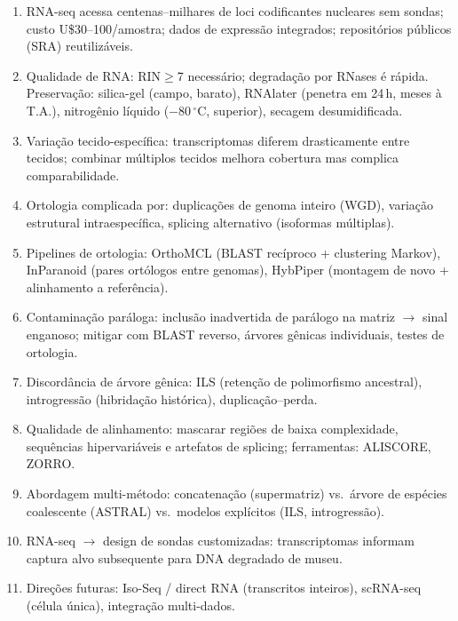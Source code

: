 \clearpage
\begin{revise}\small
\begin{enumerate}[itemsep=0pt, topsep=0pt, parsep=0pt]
    \item RNA-seq acessa centenas--milhares de loci codificantes nucleares sem sondas; custo U\$30--100/amostra; dados de expressão integrados; repositórios públicos (SRA) reutilizáveis.
    \item Qualidade de RNA: RIN$\geq$7 necessário; degradação por RNases é rápida. Preservação: silica-gel (campo, barato), RNAlater (penetra em 24\,h, meses à T.A.), nitrogênio líquido ($-80\,^\circ$C, superior), secagem desumidificada.
    \item Variação tecido-específica: transcriptomas diferem drasticamente entre tecidos; combinar múltiplos tecidos melhora cobertura mas complica comparabilidade.
    \item Ortologia complicada por: duplicações de genoma inteiro (WGD), variação estrutural intraespecífica, splicing alternativo (isoformas múltiplas).
    \item Pipelines de ortologia: OrthoMCL (BLAST recíproco + clustering Markov), InParanoid (pares ortólogos entre genomas), HybPiper (montagem de novo + alinhamento a referência).
    \item Contaminação paráloga: inclusão inadvertida de parálogo na matriz $\to$ sinal enganoso; mitigar com BLAST reverso, árvores gênicas individuais, testes de ortologia.
    \item Discordância de árvore gênica: ILS (retenção de polimorfismo ancestral), introgressão (hibridação histórica), duplicação--perda.
    \item Qualidade de alinhamento: mascarar regiões de baixa complexidade, sequências hipervariáveis e artefatos de splicing; ferramentas: ALISCORE, ZORRO.
    \item Abordagem multi-método: concatenação (supermatriz) vs.\ árvore de espécies coalescente (ASTRAL) vs.\ modelos explícitos (ILS, introgressão).
    \item RNA-seq $\to$ design de sondas customizadas: transcriptomas informam captura alvo subsequente para DNA degradado de museu.
    \item Direções futuras: Iso-Seq / direct RNA (transcritos inteiros), scRNA-seq (célula única), integração multi-dados.
\end{enumerate}
\end{revise}

\clearpage

\printbibliography[heading=subbibliography,title={Referências}]

